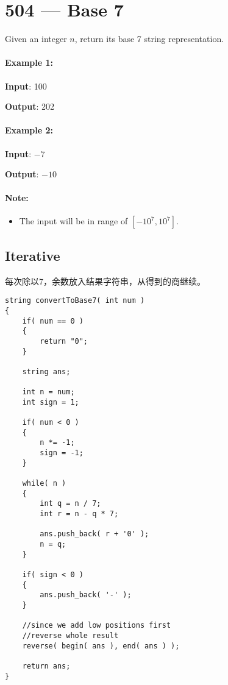 \section{504 --- Base 7}
Given an integer $n$, return its base 7 string representation.

\paragraph{Example 1:}

\begin{flushleft}
\textbf{Input}: 100

\textbf{Output}: 202

\end{flushleft}

\paragraph{Example 2:}

\begin{flushleft}
\textbf{Input}: $-7$

\textbf{Output}: $-10$
\end{flushleft}

\paragraph{Note:} 

\begin{itemize}
\item The input will be in range of $[-10^{7}, 10^{7}]$.
\end{itemize}

\subsection{Iterative}
每次除以7，余数放入结果字符串，从得到的商继续。

\setcounter{lstlisting}{0}
\begin{lstlisting}[style=customc, caption={Iterative}]
string convertToBase7( int num )
{
    if( num == 0 )
    {
        return "0";
    }

    string ans;

    int n = num;
    int sign = 1;

    if( num < 0 )
    {
        n *= -1;
        sign = -1;
    }

    while( n )
    {
        int q = n / 7;
        int r = n - q * 7;

        ans.push_back( r + '0' );
        n = q;
    }

    if( sign < 0 )
    {
        ans.push_back( '-' );
    }

    //since we add low positions first
    //reverse whole result
    reverse( begin( ans ), end( ans ) );

    return ans;
}
\end{lstlisting}




